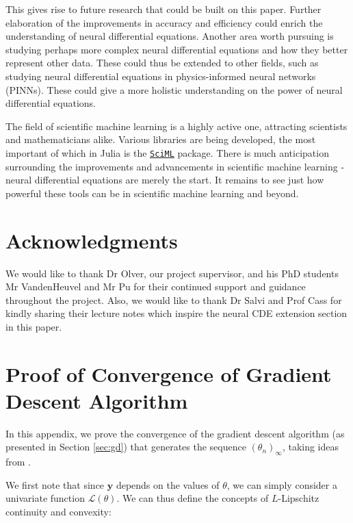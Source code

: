 \documentclass[a4paper,11pt,titlepage]{article}
\theoremstyle{definition}
\theoremstyle{plain}
\theoremstyle{remark}
\begin{document}
This gives rise to future research that could be built on this paper. Further elaboration of the improvements in accuracy and efficiency could enrich the understanding of neural differential equations. Another area worth pursuing is studying perhaps more complex neural differential equations and how they better represent other data. These could thus be extended to other fields, such as studying neural differential equations in physics-informed neural networks (PINNs). These could give a more holistic understanding on the power of neural differential equations.

The field of scientific machine learning is a highly active one, attracting scientists and mathematicians alike. Various libraries are being developed, the most important of which in Julia is the \href{https://sciml.ai/}{\texttt{SciML}} package. There is much anticipation surrounding the improvements and advancements in scientific machine learning - neural differential equations are merely the start. It remains to see just how powerful these tools can be in scientific machine learning and beyond.

\section*{Acknowledgments}

We would like to thank Dr Olver, our project supervisor, and his PhD students Mr VandenHeuvel and Mr Pu for their continued support and guidance throughout the project. Also, we would like to thank Dr Salvi and Prof Cass for kindly sharing their lecture notes which inspire the neural CDE extension section in this paper.

\pagebreak
{}
{}


\pagebreak
\appendix
\section{Proof of Convergence of Gradient Descent Algorithm}
\label{sec:gdproof}

In this appendix, we prove the convergence of the gradient descent algorithm (as presented in Section \ref{sec:gd}) that generates the sequence $(\theta_n)_\infty$, taking ideas from \cite{gower2015}.

We first note that since $\mathbf{\hat{y}}$ depends on the values of $\theta$, we can simply consider a univariate function $\mathcal{L}(\theta)$. We can thus define the concepts of $L$-Lipschitz continuity and convexity:
\end{document}
